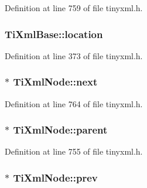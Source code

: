 Definition at line 759 of file tinyxml.h.

\hypertarget{classTiXmlBase_a0d992580f3bc264909f898e942677a3c}{
\subsubsection[{location}]{ {\bf TiXmlBase::location}}}
\label{d8/d47/classTiXmlBase_a0d992580f3bc264909f898e942677a3c}


Definition at line 373 of file tinyxml.h.

\hypertarget{classTiXmlNode_a2f329cc993d2d34df76e17dcbb776b45}{
\subsubsection[{next}]{$\ast$ {\bf TiXmlNode::next}}}
\label{d3/dd5/classTiXmlNode_a2f329cc993d2d34df76e17dcbb776b45}


Definition at line 764 of file tinyxml.h.

\hypertarget{classTiXmlNode_a662c4de61244e4fa5bd4e2d8c63143a5}{
\subsubsection[{parent}]{$\ast$ {\bf TiXmlNode::parent}}}
\label{d3/dd5/classTiXmlNode_a662c4de61244e4fa5bd4e2d8c63143a5}


Definition at line 755 of file tinyxml.h.

\hypertarget{classTiXmlNode_a9c5370ea2cbfd9f0e0f7b30a57fd68f5}{
\subsubsection[{prev}]{$\ast$ {\bf TiXmlNode::prev}}}
\label{d3/dd5/classTiXmlNode_a9c5370ea2cbfd9f0e0f7b30a57fd68f5}



